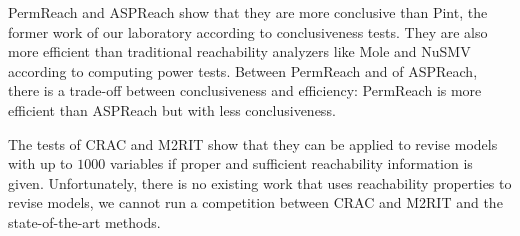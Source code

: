 PermReach and ASPReach show that they are more conclusive than Pint, the former work of our laboratory according to conclusiveness tests.
They are also more efficient than traditional reachability analyzers like Mole and NuSMV according to computing power tests.
Between PermReach and of ASPReach, there is a trade-off between conclusiveness and efficiency: 
PermReach is more efficient than ASPReach but with less conclusiveness.

The tests of CRAC and M2RIT show that they can be applied to revise models with up to $1000$ variables if proper and sufficient reachability information is given.
Unfortunately, there is no existing work that uses reachability properties to revise models, we cannot run a competition between CRAC and M2RIT and the state-of-the-art methods.
